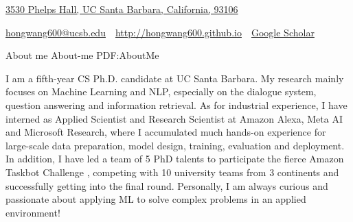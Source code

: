 \documentclass[letterpaper,MMMyyyy,nonstopmode]{simpleresumecv}
\newcommand{\CVAuthor}{Hong Wang}
\newcommand{\CVWebpage}{http://hongwang600.github.io}
\begin{document}

\Title{\CVAuthor}

\begin{SubTitle}
\href{https://www.google.com/maps/place/Phelps+Hall/@34.4161308,-119.8468366,17z/data=!3m1!4b1!4m5!3m4!1s0x80e93f7042b51aa9:0xc80cbd08cacd9e49!8m2!3d34.4161308!4d-119.8446426}
{3530 Phelps Hall, UC Santa Barbara, California, 93106}
\par
\href{mailto:hongwang600@ucsb.edu}
{hongwang600@ucsb.edu}
\,\SubBulletSymbol\,
\href{\CVWebpage}
{\url{\CVWebpage}}
\,\SubBulletSymbol\,
\href{https://scholar.google.com/citations?user=M9uQHIUAAAAJ&hl=en&authuser=1#}
{Google Scholar}
\end{SubTitle}

\begin{Body}





\Section
{About me}
{About-me}
{PDF:AboutMe}

\Entry
I am a fifth-year CS Ph.D. candidate at UC Santa Barbara. My research mainly focuses on Machine Learning and NLP, especially on the dialogue system, question answering and information retrieval. As for industrial experience, I have interned as Applied Scientist and Research Scientist at Amazon Alexa, Meta AI and Microsoft Research, where I accumulated much hands-on experience for large-scale data preparation, model design, training, evaluation and deployment. In addition, I have led a team of 5 PhD talents to participate the fierce Amazon Taskbot Challenge , competing with 10 university teams from 3 continents and successfully getting into the final round. Personally, I am always curious and passionate about applying ML to solve complex problems in an applied environment! 



\end{Body}
\end{document}
